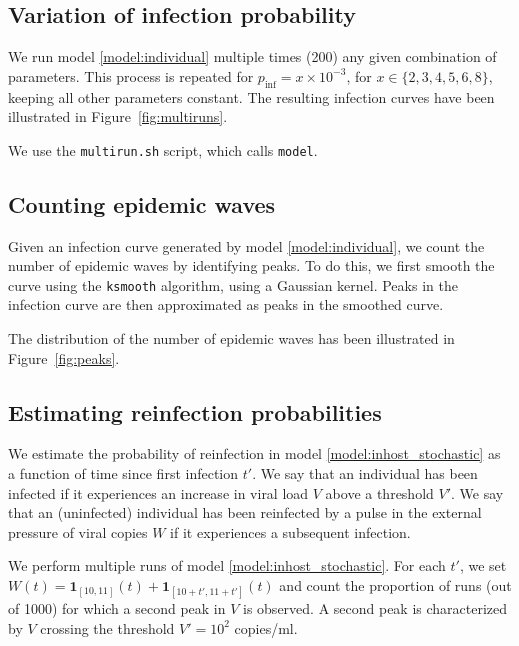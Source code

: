 \documentclass[11pt]{article}
\numberwithin{equation}{subsection}
\begin{document}
    \subsection{Variation of infection probability}

    We run model \ref{model:individual} multiple times (200) any given
    combination of parameters. This process is repeated for $p_\text{inf} = x
    \times 10^{-3}$, for $x \in \{2, 3, 4, 5, 6, 8\}$, keeping all other
    parameters constant. The resulting infection curves have been illustrated
    in Figure~\ref{fig:multiruns}.

    We use the \texttt{multirun.sh} script, which calls \texttt{model}.


    \subsection{Counting epidemic waves}

    Given an infection curve generated by model \ref{model:individual}, we
    count the number of epidemic waves by identifying peaks. To do this, we
    first smooth the curve using the \texttt{ksmooth} algorithm, using a
    Gaussian kernel. Peaks in the infection curve are then approximated as
    peaks in the smoothed curve.

    The distribution of the number of epidemic waves has been illustrated in
    Figure~\ref{fig:peaks}.


    \subsection{Estimating reinfection probabilities}

    We estimate the probability of reinfection in model
    \ref{model:inhost_stochastic} as a function of time since first infection
    $t'$. We say that an individual has been infected if it experiences an
    increase in viral load $V$ above a threshold $V'$. We say that an
    (uninfected) individual has been reinfected by a pulse in the external
    pressure of viral copies $W$ if it experiences a subsequent infection.

    We perform multiple runs of model \ref{model:inhost_stochastic}.  For each
    $t'$, we set $W(t) = \mathbf{1}_{[10, 11]}(t) + \mathbf{1}_{[10 + t', 11 +
    t']}(t)$ and count the proportion of runs (out of 1000) for which a second
    peak in $V$ is observed. A second peak is characterized by $V$ crossing
    the threshold $V' = 10^2$ copies/ml.
\end{document}
